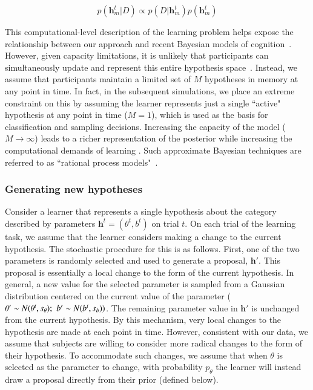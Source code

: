 \documentclass[3p,twocolumn,authoryear,10pt]{elsarticle}
\begin{document}
\begin{equation}
p(\textbf{h}_m^t|D) \propto p(D|\textbf{h}_m^t)p(\textbf{h}_m^t)\label{posterior.eq}
\end{equation}
 
\noindent
This computational-level description of the
learning problem helps expose the relationship between our approach and recent Bayesian models
of cognition~\citep{Griffiths:2010fk}.
However, given capacity limitations, it is unlikely that participants can simultaneously
update and represent this entire hypothesis space~\citep{Vul:2009xi,brown2009detecting}.  Instead, we assume that participants
maintain a limited set of $M$ hypotheses in memory at any point in time.  In fact,
in the subsequent simulations, we place an extreme constraint on this by assuming the
learner represents just a single ``active" hypothesis at any point in time ($M=1$), which is 
used as the basis for classification and sampling decisions.  Increasing the capacity of 
the model ($M \rightarrow \infty$) leads to a richer representation of the posterior while increasing the 
computational demands of learning \citep{Sanborn:2006p9933}.  Such approximate Bayesian techniques
are referred to as ``rational process models"~\citep{Vul:2009uq}.\\

\subsubsection{Generating new hypotheses}
Consider a learner that represents a single
hypothesis about the category described by 
parameters $\textbf{h}^t=(\theta^t,b^t)$ on trial $t$.  On each
trial of the learning task, we assume that the learner considers making a change to the current
hypothesis.  The stochastic procedure for this is as follows.  First, one of the two 
parameters is randomly selected and used to generate a proposal, $\textbf{h}'$.  This proposal is 
essentially a local change to the form of the current hypothesis.  In general, a new value for
the selected parameter is sampled from 
a Gaussian distribution centered on the current value of the parameter 
($\theta' \sim N(\theta^t,s_{\theta}); \hspace{.05in} b' \sim N(b^t,s_b))$. 
The remaining parameter value in $\textbf{h}'$ is unchanged 
from the current hypothesis.  By this mechanism, very local changes to the hypothesis
are made at each point in time. However, consistent with our data, we assume that subjects are willing to consider more radical changes to the form of their hypothesis. To accommodate such changes, we assume that when $\theta$ is selected as the parameter to change, with probability $p_\theta$ the learner will instead draw a proposal directly from their prior (defined below). 
\end{document}
